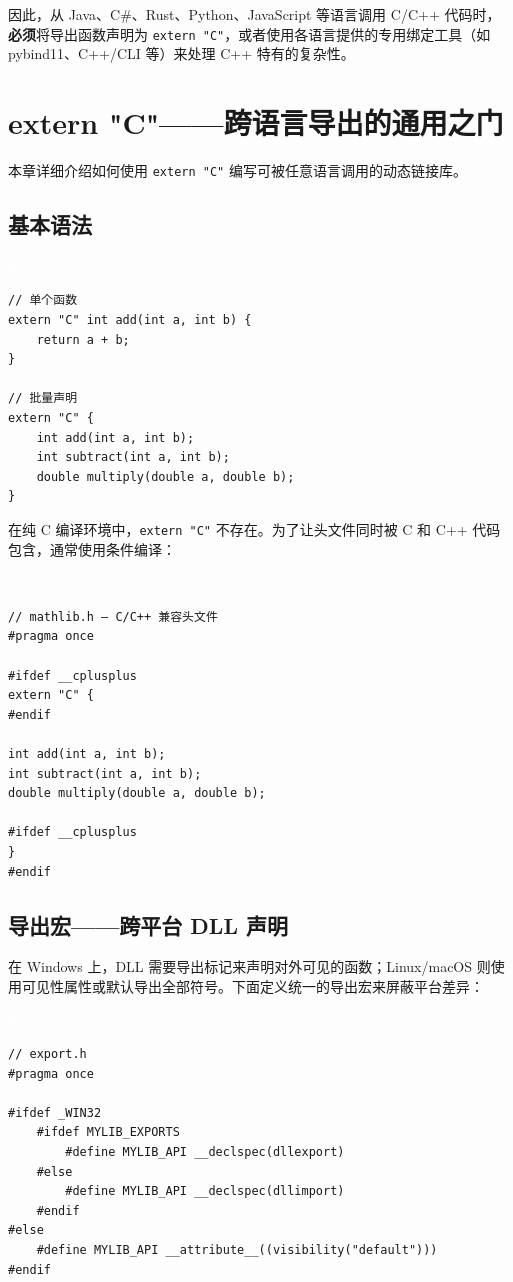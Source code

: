 \documentclass[12pt,a4paper,fontset=fandol]{ctexbook}
\newcommand{\cpplabel}{%
  \begin{tcolorbox}[enhanced,colback=cppheadbg,colframe=cppheadbg,
    arc=1mm,boxrule=0mm,left=6pt,right=6pt,top=2pt,bottom=2pt,
    halign=left,oversize]
    \textcolor{white}{\small\bfseries C++}
  \end{tcolorbox}\vspace{-4pt}}
\newcommand{\cpp}[1]{C++#1}
\begin{document}
因此，从 Java、C\#、Rust、Python、JavaScript 等语言调用 C/\allowbreak{}\cpp{} 代码时，\textbf{必须}将导出函数声明为 \texttt{extern "C"}，或者使用各语言提供的专用绑定工具（如 pybind11、C++/CLI 等）来处理 \cpp{} 特有的复杂性。


\chapter{extern "C"——跨语言导出的通用之门}

本章详细介绍如何使用 \texttt{extern "C"} 编写可被任意语言调用的动态链接库。

\section{基本语法}

\cpplabel
\begin{lstlisting}[style=cppstyle]
// 单个函数
extern "C" int add(int a, int b) {
    return a + b;
}

// 批量声明
extern "C" {
    int add(int a, int b);
    int subtract(int a, int b);
    double multiply(double a, double b);
}
\end{lstlisting}

在纯 C 编译环境中，\texttt{extern "C"} 不存在。为了让头文件同时被 C 和 \cpp{} 代码包含，通常使用条件编译：

\cpplabel
\begin{lstlisting}[style=cppstyle]
// mathlib.h — C/C++ 兼容头文件
#pragma once

#ifdef __cplusplus
extern "C" {
#endif

int add(int a, int b);
int subtract(int a, int b);
double multiply(double a, double b);

#ifdef __cplusplus
}
#endif
\end{lstlisting}

\section{导出宏——跨平台 DLL 声明}

在 Windows 上，DLL 需要导出标记来声明对外可见的函数；Linux/macOS 则使用可见性属性或默认导出全部符号。下面定义统一的导出宏来屏蔽平台差异：

\cpplabel
\begin{lstlisting}[style=cppstyle]
// export.h
#pragma once

#ifdef _WIN32
    #ifdef MYLIB_EXPORTS
        #define MYLIB_API __declspec(dllexport)
    #else
        #define MYLIB_API __declspec(dllimport)
    #endif
#else
    #define MYLIB_API __attribute__((visibility("default")))
#endif
\end{lstlisting}
\end{document}
